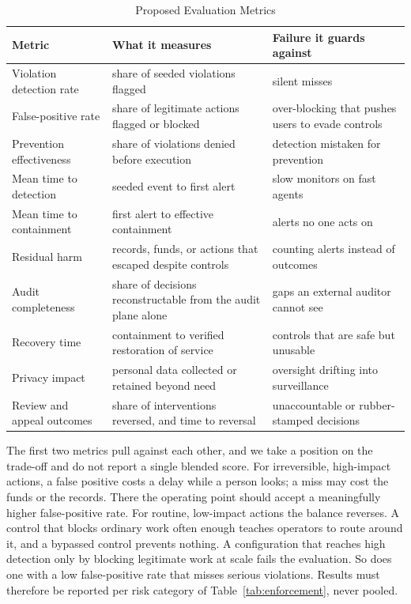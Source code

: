 \documentclass{ieeeaccess}
\begin{document}
\begin{table}[!t]
\caption{Proposed Evaluation Metrics}
\label{tab:metrics}
\centering
\footnotesize
\setlength{\tabcolsep}{3pt}
\begin{tabular}{>{\raggedright\arraybackslash}p{1.85cm}>{\raggedright\arraybackslash}p{2.7cm}>{\raggedright\arraybackslash}p{2.6cm}}
\toprule
\rowcolor{darkblue!15}
\textbf{Metric} & \textbf{What it measures} & \textbf{Failure it guards against} \\
\midrule
\rowcolor{darkblue!5}
Violation detection rate & share of seeded violations flagged & silent misses \\

False-positive rate & share of legitimate actions flagged or blocked & over-blocking that pushes users to evade controls \\
\rowcolor{darkblue!5}
Prevention effectiveness & share of violations denied before execution & detection mistaken for prevention \\

Mean time to detection & seeded event to first alert & slow monitors on fast agents \\
\rowcolor{darkblue!5}
Mean time to containment & first alert to effective containment & alerts no one acts on \\

Residual harm & records, funds, or actions that escaped despite controls & counting alerts instead of outcomes \\
\rowcolor{darkblue!5}
Audit completeness & share of decisions reconstructable from the audit plane alone & gaps an external auditor cannot see \\

Recovery time & containment to verified restoration of service & controls that are safe but unusable \\
\rowcolor{darkblue!5}
Privacy impact & personal data collected or retained beyond need & oversight drifting into surveillance \\

Review and appeal outcomes & share of interventions reversed, and time to reversal & unaccountable or rubber-stamped decisions \\
\bottomrule
\end{tabular}
\end{table}

The first two metrics pull against each other, and we take a position on the trade-off and do not report a single blended score. For irreversible, high-impact actions, a false positive costs a delay while a person looks; a miss may cost the funds or the records. There the operating point should accept a meaningfully higher false-positive rate. For routine, low-impact actions the balance reverses. A control that blocks ordinary work often enough teaches operators to route around it, and a bypassed control prevents nothing. A configuration that reaches high detection only by blocking legitimate work at scale fails the evaluation. So does one with a low false-positive rate that misses serious violations. Results must therefore be reported per risk category of Table~\ref{tab:enforcement}, never pooled.
\end{document}
